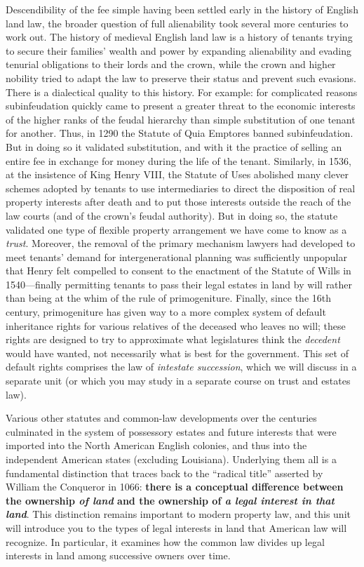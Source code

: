 Descendibility of the fee simple having been settled early in the history of
English land law, the broader question of full alienability took several more
centuries to work out. The history of medieval English land law is a history of
tenants trying to secure their families' wealth and power by expanding
alienability and evading tenurial obligations to their lords and the crown,
while the crown and higher nobility tried to adapt the law to preserve their
status and prevent such evasions. There is a dialectical quality to this
history. For example: for complicated reasons subinfeudation quickly came to
present a greater threat to the economic interests of the higher ranks of the
feudal hierarchy than simple substitution of one tenant for another. Thus, in
1290 the Statute of Quia Emptores banned subinfeudation. But in doing so it
validated substitution, and with it the practice of selling an entire fee in
exchange for money during the life of the tenant. Similarly, in 1536, at the
insistence of King Henry VIII, the Statute of Uses abolished many clever
schemes adopted by tenants to use intermediaries to direct the disposition of
real property interests after death and to put those interests outside the
reach of the law courts (and of the crown's feudal authority). But in doing so,
the statute validated one type of flexible property arrangement we have come to
know as a \textit{trust}. Moreover, the removal of the primary mechanism
lawyers had developed to meet tenants' demand for intergenerational planning
was sufficiently unpopular that Henry felt compelled to consent to the
enactment of the Statute of Wills in 1540---finally permitting tenants to pass
their legal estates in land by will rather than being at the whim of the rule
of primogeniture. Finally, since the 16th century, primogeniture has given way
to a more complex system of default inheritance rights for various relatives of
the deceased who leaves no will; these rights are designed to try to
approximate what legislatures think the \textit{decedent} would have wanted,
not necessarily what is best for the government. This set of default rights
comprises the law of \textit{intestate succession}, which we will discuss in a
separate unit (or which you may study in a separate course on trust and estates
law).

Various other statutes and common-law developments over the centuries culminated
in the system of possessory estates and future interests that were imported
into the North American English colonies, and thus into the independent
American states (excluding Louisiana). Underlying them all is a fundamental
distinction that traces back to the ``radical title'' asserted by William the
Conqueror in 1066: \textbf{there is a conceptual difference between the
ownership \textit{of land} and the ownership of
\textit{a legal interest in that land}}. This distinction
remains important to modern property law, and this unit will introduce you to
the types of legal interests in land that American law will recognize. In
particular, it examines how the common law divides up legal interests in land
among successive owners over time.

